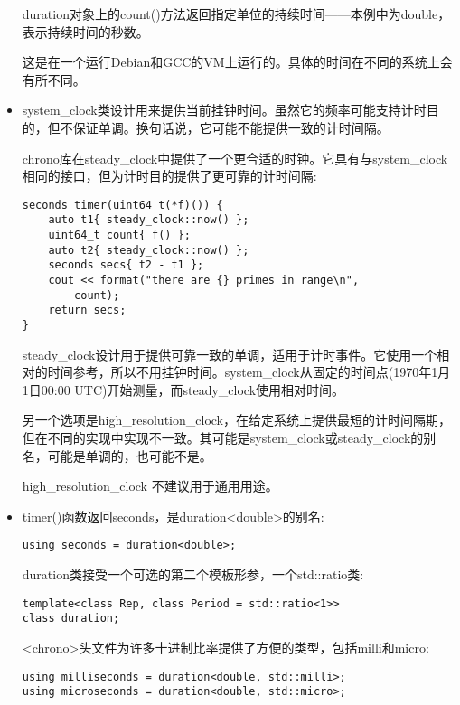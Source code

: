 \begin{itemize}
duration对象上的count()方法返回指定单位的持续时间——本例中为double，表示持续时间的秒数。

这是在一个运行Debian和GCC的VM上运行的。具体的时间在不同的系统上会有所不同。

\item 
system\_clock类设计用来提供当前挂钟时间。虽然它的频率可能支持计时目的，但不保证单调。换句话说，它可能不能提供一致的计时间隔。

chrono库在steady\_clock中提供了一个更合适的时钟。它具有与system\_clock相同的接口，但为计时目的提供了更可靠的计时间隔:

\begin{lstlisting}[style=styleCXX]
seconds timer(uint64_t(*f)()) {
	auto t1{ steady_clock::now() };
	uint64_t count{ f() };
	auto t2{ steady_clock::now() };
	seconds secs{ t2 - t1 };
	cout << format("there are {} primes in range\n",
		count);
	return secs;
}
\end{lstlisting}

steady\_clock设计用于提供可靠一致的单调，适用于计时事件。它使用一个相对的时间参考，所以不用挂钟时间。system\_clock从固定的时间点(1970年1月1日00:00 UTC)开始测量，而steady\_clock使用相对时间。

另一个选项是high\_resolution\_clock，在给定系统上提供最短的计时间隔期，但在不同的实现中实现不一致。其可能是system\_clock或steady\_clock的别名，可能是单调的，也可能不是。

high\_resolution\_clock 不建议用于通用用途。

\item 
timer()函数返回seconds，是duration<double>的别名:

\begin{lstlisting}[style=styleCXX]
using seconds = duration<double>;
\end{lstlisting}

duration类接受一个可选的第二个模板形参，一个std::ratio类:

\begin{lstlisting}[style=styleCXX]
template<class Rep, class Period = std::ratio<1>>
class duration;
\end{lstlisting}

<chrono>头文件为许多十进制比率提供了方便的类型，包括milli和micro:

\begin{lstlisting}[style=styleCXX]
using milliseconds = duration<double, std::milli>;
using microseconds = duration<double, std::micro>;
\end{lstlisting}


\end{itemize}
